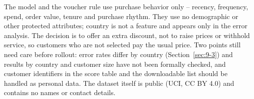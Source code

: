 The model and the voucher rule use purchase behavior only -- recency, frequency, spend, order value, tenure and purchase rhythm. They use no demographic or other protected attributes; country is not a feature and appears only in the error analysis. The decision is to offer an extra discount, not to raise prices or withhold service, so customers who are not selected pay the usual price. Two points still need care before rollout: error rates differ by country (Section~\ref{sec:9-3}) and results by country and customer size have not been formally checked, and customer identifiers in the score table and the downloadable list should be handled as personal data. The dataset itself is public (UCI, CC BY 4.0) and contains no names or contact details.
